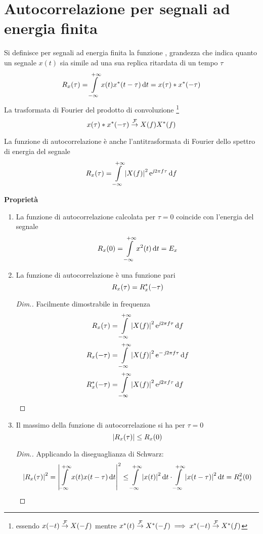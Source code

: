 \section{Autocorrelazione per segnali ad energia finita}
Si definisce per segnali ad energia finita la funzione , grandezza che indica quanto un segnale $x(t)$ sia simile ad una sua replica ritardata di un tempo $\tau$
\begin{equation}R_x(\tau)=\int\limits_{-\infty}^{+\infty}{x(t){x}^\ast(t-\tau)}{\,\mathop{}\!\mathrm{d}{t}}=x(\tau)\ast {x}^\ast(-\tau)\end{equation}
La trasformata di Fourier del prodotto di convoluzione \footnote{essendo $x(-t)\overset{\operatorname{\mathcal{F}}}{\to}X(-f)$ mentre ${x}^\ast(t)\overset{\operatorname{\mathcal{F}}}{\to}{X}^\ast(-f) \implies {x}^\ast(-t)\overset{\operatorname{\mathcal{F}}}{\to}{X}^\ast(f)$
}
\[x(\tau)\ast {x}^\ast(-\tau)\overset{\operatorname{\mathcal{F}}}{\to}X(f){X}^\ast(f)\]

La funzione di autocorrelazione è anche l'antitrasformata di Fourier dello spettro di energia del segnale
\begin{equation}
R_x(\tau)=\int\limits_{-\infty}^{+\infty}{\left|{X(f)}\right|^2\operatorname{e}^{\operatorname{\mathit{j}\!} 2\pi f\tau}}{\,\mathop{}\!\mathrm{d}{f}}
\end{equation}

\textbf{Proprietà}
\begin{enumerate}
\item La funzione di autocorrelazione calcolata per $\tau=0$ coincide con l'energia del segnale
\[R_x(0)=\int\limits_{-\infty}^{+\infty}{x^2(t)}{\,\mathop{}\!\mathrm{d}{t}}=E_x\]

\item La funzione di autocorrelazione è una funzione pari
\[R_x(\tau)=R_{x}^\ast(-\tau)\]
\begin{proof}[Dim.]
Facilmente dimostrabile in frequenza
\begin{align*}
R_x(\tau)&=\int\limits_{-\infty}^{+\infty}{\left|{X(f)}\right|^2\operatorname{e}^{\operatorname{\mathit{j}\!} 2\pi f\tau}}{\,\mathop{}\!\mathrm{d}{f}}\\
R_x(-\tau)&=\int\limits_{-\infty}^{+\infty}{\left|{X(f)}\right|^2\operatorname{e}^{-\operatorname{\mathit{j}\!} 2\pi f\tau}}{\,\mathop{}\!\mathrm{d}{f}}\\
R_{x}^\ast(-\tau)&=\int\limits_{-\infty}^{+\infty}{\left|{X(f)}\right|^2\operatorname{e}^{\operatorname{\mathit{j}\!} 2\pi f\tau}}{\,\mathop{}\!\mathrm{d}{f}}
\qedhere
\end{align*}
\end{proof}

\item Il massimo della funzione di autocorrelazione si ha per $\tau=0$
\[\left|{R_x(\tau)}\right|\leq R_x(0)\]
\begin{proof}[Dim.]
Applicando la diseguaglianza di Schwarz:
\[\left|{R_x(\tau)}\right|^2=\left|{\int\limits_{-\infty}^{+\infty}{x(t)x(t-\tau)}{\,\mathop{}\!\mathrm{d}{t}}}\right|^2\leq\int\limits_{-\infty}^{+\infty}{\left|{x(t)}\right|^2}{\,\mathop{}\!\mathrm{d}{t}}\cdot\int\limits_{-\infty}^{+\infty}{\left|{x(t-\tau)}\right|^2}{\,\mathop{}\!\mathrm{d}{t}}=R_x^2(0)\qedhere\]
\end{proof}
\end{enumerate}

